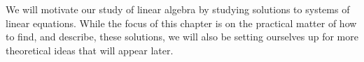\begin{para}We will motivate our study of linear algebra by studying solutions to systems of linear equations.  While the focus of this chapter is on the practical matter of how to find, and describe, these solutions, we will also be setting ourselves up for more theoretical ideas that will appear later.\end{para}